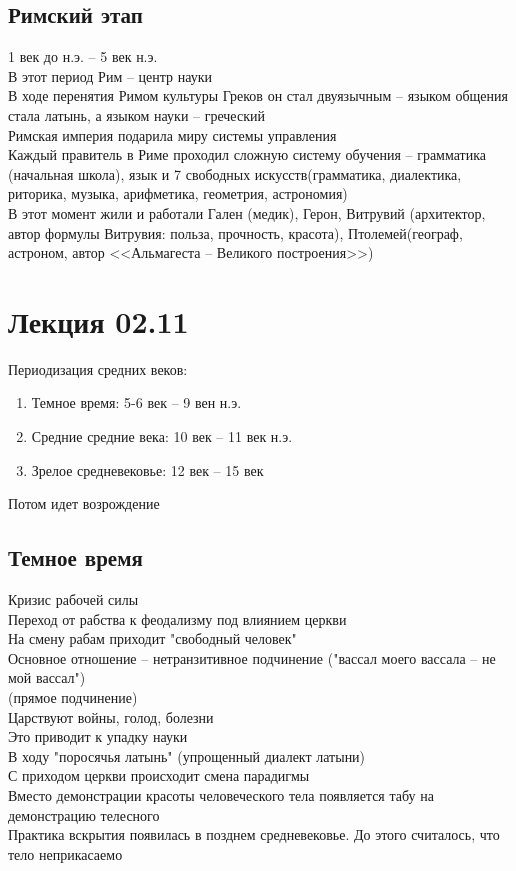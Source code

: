 \documentclass[12pt]{article}
\begin{document}
\subsection{Римский этап}
1 век до н.э. -- 5 век н.э.\\
В этот период Рим -- центр науки\\
В ходе перенятия Римом культуры Греков он стал двуязычным -- языком общения стала латынь, а языком науки -- греческий\\
Римская империя подарила миру системы управления\\
Каждый правитель в Риме проходил сложную систему обучения -- грамматика (начальная школа), язык и 7 свободных искусств(грамматика, диалектика, риторика, музыка, арифметика, геометрия, астрономия)\\
В этот момент жили и работали Гален (медик), Герон, Витрувий (архитектор, автор формулы Витрувия: польза, прочность, красота), Птолемей(географ, астроном, автор <<Альмагеста -- Великого построения>>)\\
\section{Лекция 02.11}
Периодизация средних веков:
\begin{enumerate}
    \item Темное время: 5-6 век -- 9 вен н.э.
    \item Средние средние века: 10 век -- 11 век н.э.
    \item Зрелое средневековье: 12 век -- 15 век
\end{enumerate}
Потом идет возрождение
\subsection{Темное время}
Кризис рабочей силы\\
Переход от рабства к феодализму под влиянием церкви\\
На смену рабам приходит "свободный человек"\\
Основное отношение -- нетранзитивное подчинение ("вассал моего вассала -- не мой вассал")\\
(прямое подчинение)\\
Царствуют войны, голод, болезни\\
Это приводит к упадку науки\\
В ходу "поросячья латынь" (упрощенный диалект латыни)\\
С приходом церкви происходит смена парадигмы\\
Вместо демонстрации красоты человеческого тела появляется табу на демонстрацию телесного\\
Практика вскрытия появилась в позднем средневековье. До этого считалось, что тело неприкасаемо\\
\end{document}
